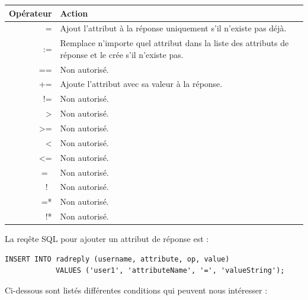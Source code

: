 \begin{tabular}{|r|l|}
	\hline
  \textbf{Opérateur} & \textbf{Action} \\
  \hline
  = & Ajout l'attribut à la réponse uniquement s'il n'existe pas déjà. \\
  \hline
  := & Remplace n'importe quel attribut dans la liste des attributs de réponse et le crée s'il n'existe pas. \\
  \hline
  == & Non autorisé. \\
  \hline
  += & Ajoute l'attribut avec sa valeur à la réponse. \\
  \hline
  != & Non autorisé. \\
  \hline
  > & Non autorisé. \\
  \hline
  >= & Non autorisé. \\
  \hline
  < & Non autorisé. \\
  \hline
  <= & Non autorisé. \\
  \hline
  =~ & Non autorisé. \\
  \hline
  !~ & Non autorisé. \\
  \hline
  =* & Non autorisé. \\
  \hline
  !* & Non autorisé. \\
	\hline
\end{tabular}

La reqête SQL pour ajouter un attribut de réponse est :

\begin{verbatim}
INSERT INTO radreply (username, attribute, op, value)
            VALUES ('user1', 'attributeName', '=', 'valueString');
\end{verbatim}

Ci-dessous sont listés différentes conditions qui peuvent nous intéresser :

